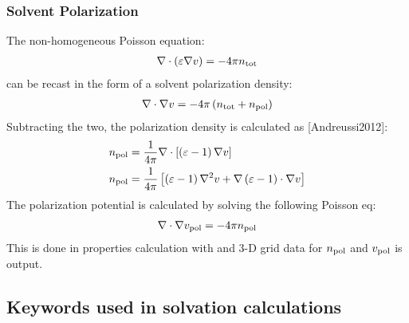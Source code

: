\documentclass[letterpaper,10pt,english]{sphinxmanual}
\begin{document}
\subsubsection{Solvent Polarization}
\label{\detokenize{implicit_solvation_v3:solvent-polarization}}
The non-homogeneous Poisson equation:
\begin{equation*}
\begin{split}\nabla\cdot\left(\varepsilon \nabla v\right)=-4\pi n_{\rm tot}\end{split}
\end{equation*}
can be recast in the form of a solvent polarization density:
\begin{equation*}
\begin{split}\nabla\cdot \nabla v=-4\pi \left(n_{\rm tot}+n_{\rm pol}\right)\end{split}
\end{equation*}
Subtracting the two, the polarization density is calculated as
{[}Andreussi2012{]}:
\begin{equation*}
\begin{split}\begin{aligned}
n_{\rm pol}&=\frac{1}{4\pi}\nabla\cdot\left[\left(\varepsilon-1\right)\nabla v\right] \\
n_{\rm pol}&=\frac{1}{4\pi}\left[\left(\varepsilon-1\right)\nabla^2 v +\nabla\left(\varepsilon-1\right)\cdot\nabla v\right]\end{aligned}\end{split}
\end{equation*}
The polarization potential is calculated by solving the following
Poisson eq:
\begin{equation*}
\begin{split}\nabla\cdot\nabla v_{\rm pol}=-4\pi n_{\rm pol}\end{split}
\end{equation*}
This is done in properties calculation with
 and 3-D grid data for \(n_{\rm pol}\)
and \(v_{\rm pol}\) is output.


\subsection{Keywords used in solvation calculations}
\label{\detokenize{implicit_solvation_v3:keywords-used-in-solvation-calculations}}
\end{document}
